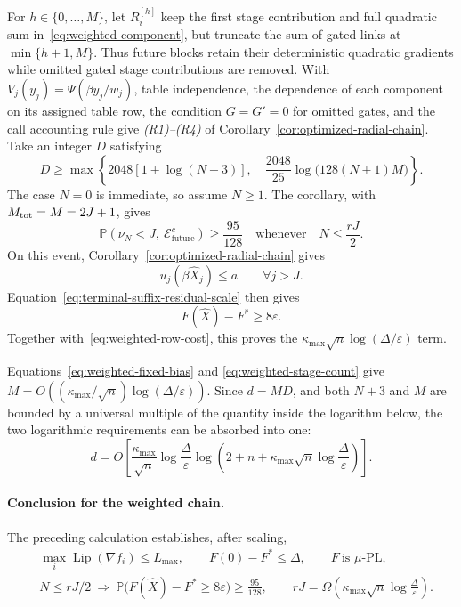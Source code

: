 \documentclass{article}
\theoremstyle{definition}
\newcommand{\Prob}{\mathbb{P}}
\newcommand{\cEfuture}{\mathcal{E}_{\mathrm{future}}}
\begin{document}
For $h\in\{0,\ldots,M\}$, let $R_i^{[h]}$ keep the first stage contribution and full
quadratic sum in~\eqref{eq:weighted-component}, but truncate the sum of gated links
at $\min\{h+1,M\}$.  Thus future blocks retain their deterministic quadratic
gradients while omitted gated stage contributions are removed.  With
$V_j(y_j)=\Psi(\beta y_j/w_j)$, table independence, the dependence of each
component on its assigned table row, the condition $G=G'=0$ for omitted gates,
and the call accounting rule give \emph{(R1)--(R4)} of
Corollary~\ref{cor:optimized-radial-chain}.  Take an integer $D$
satisfying
\begin{equation}
 D\ge\max\left\{
 2048[1+\log(N+3)],\quad
 \frac{2048}{25}\log\bigl(128(N+1)M\bigr)
 \right\}.
 \label{eq:weighted-dimension-requirement}
\end{equation}
The case $N=0$ is immediate, so assume $N\ge1$.
The corollary, with $M_{\rm tot}=M=2J+1$, gives
\begin{equation}
 \Prob(\nu_N<J,\ \cEfuture^c)\ge\frac{95}{128}
 \quad\text{whenever}\quad
 N\le\frac{rJ}{2}.
 \label{eq:weighted-query-budget}
\end{equation}
On this event, Corollary~\ref{cor:optimized-radial-chain} gives
\begin{equation}
 u_j(\beta\widehat X_j)\le a
 \qquad\forall j>J.
\end{equation}
Equation~\eqref{eq:terminal-suffix-residual-scale} then gives
\begin{equation}
 F(\widehat X)-F^*\ge8\varepsilon.
\end{equation}
Together with~\eqref{eq:weighted-row-cost}, this proves the
$\kappa_{\max}\sqrt n\log(\Delta/\varepsilon)$ term.

Equations~\eqref{eq:weighted-fixed-bias} and
\eqref{eq:weighted-stage-count} give
$M=O((\kappa_{\max}/\sqrt n)\log(\Delta/\varepsilon))$.  Since $d=MD$,
and both $N+3$ and $M$ are bounded by a universal multiple of the quantity
inside the logarithm below, the two logarithmic requirements can be absorbed
into one:
\begin{equation}
 d=O\!\left[
 \frac{\kappa_{\max}}{\sqrt n}
 \log\frac{\Delta}{\varepsilon}
 \log\!\left(
 2+n+\kappa_{\max}\sqrt n
 \log\frac{\Delta}{\varepsilon}
 \right)
 \right].
 \label{eq:pl-dimension}
\end{equation}

\paragraph{Conclusion for the weighted chain.}
The preceding calculation establishes, after scaling,
\begin{equation*}
\begin{aligned}
 &\max_i\operatorname{Lip}(\nabla f_i)\le L_{\max},
 \qquad F(0)-F^*\le\Delta,
 \qquad F\ \text{is $\mu$-PL},\\
 &N\le rJ/2
 \ \Longrightarrow\ 
 \Prob\bigl(F(\widehat X)-F^*\ge8\varepsilon\bigr)\ge\frac{95}{128},
 \qquad
 rJ=\Omega\!\left(\kappa_{\max}\sqrt n\log\frac\Delta\varepsilon\right).
\end{aligned}
\end{equation*}
\end{document}
